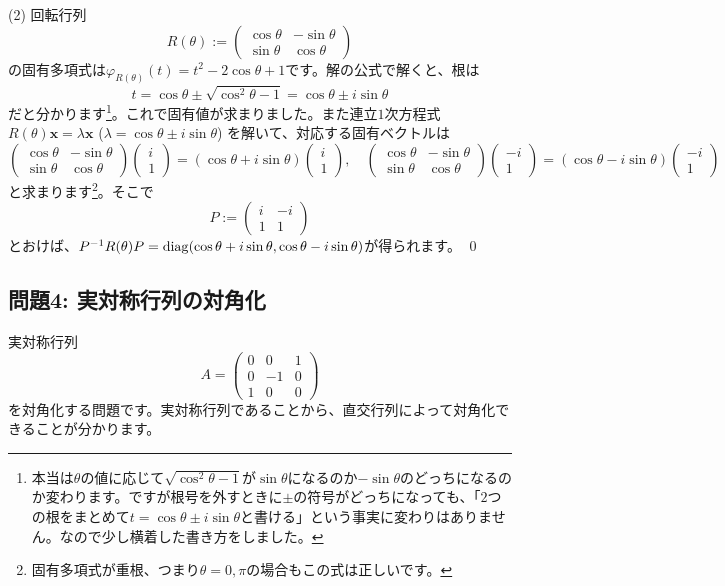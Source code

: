 \noindent (2) 回転行列
\[
R(\theta) :=
\begin{pmatrix}
\cos \theta & -\sin \theta \\
\sin \theta & \cos \theta
\end{pmatrix}
\]
の固有多項式は$\varphi_{R(\theta)}(t) = t^2 - 2\cos \theta + 1$です。解の公式で解くと、根は
\[
t = \cos \theta \pm \sqrt{\cos^2\theta - 1} = \cos \theta \pm i \sin \theta
\]
だと分かります\footnote{本当は$\theta$の値に応じて$\sqrt{\cos^2\theta - 1}$が$\sin \theta$になるのか$-\sin\theta$のどっちになるのか変わります。ですが根号を外すときに$\pm$の符号がどっちになっても、「$2$つの根をまとめて$t = \cos \theta \pm i \sin \theta$と書ける」という事実に変わりはありません。なので少し横着した書き方をしました。}。これで固有値が求まりました。また連立$1$次方程式$R(\theta)\bm{x} = \lambda \bm{x}$ ($\lambda = \cos \theta \pm i \sin \theta$) を解いて、対応する固有ベクトルは
\[
\begin{pmatrix}
\cos \theta & -\sin \theta \\
\sin \theta & \cos \theta
\end{pmatrix}
\begin{pmatrix}
i \\
1
\end{pmatrix}
=
(\cos\theta + i \sin \theta)
\begin{pmatrix}
i \\
1
\end{pmatrix}, \quad
\begin{pmatrix}
\cos \theta & -\sin \theta \\
\sin \theta & \cos \theta
\end{pmatrix}
\begin{pmatrix}
-i \\
1
\end{pmatrix}
=
(\cos\theta - i \sin \theta)
\begin{pmatrix}
-i \\
1
\end{pmatrix}
\]
と求まります\footnote{固有多項式が重根、つまり$\theta = 0, \pi$の場合もこの式は正しいです。}。そこで
\[
P :=
\begin{pmatrix}
i & -i \\
1 & 1
\end{pmatrix}
\]
とおけば、$P^{-1} R(\theta) P = \operatorname{diag}(\cos\theta + i\sin \theta, \cos\theta - i \sin\theta)$が得られます。 \qed

\subsection{問題4: 実対称行列の対角化}
実対称行列
\[
A =
\begin{pmatrix}
0 & 0 & 1 \\
0 & -1 & 0 \\
1 & 0 & 0 
\end{pmatrix}
\]
を対角化する問題です。実対称行列であることから、直交行列によって対角化できることが分かります。

